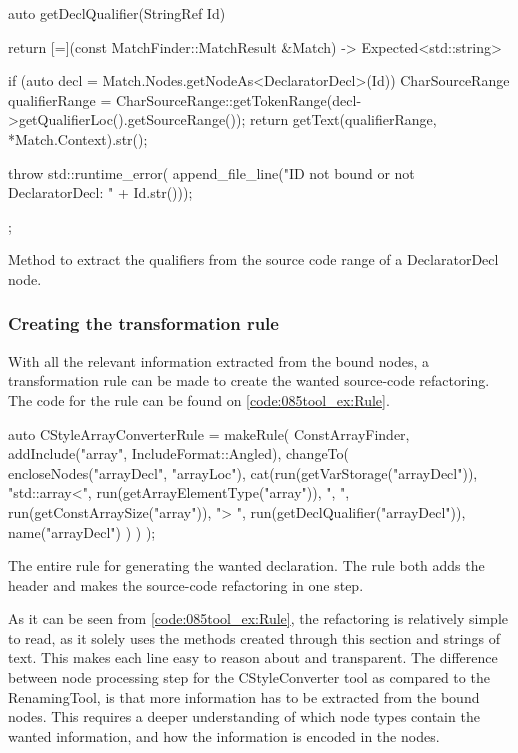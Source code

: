 \begin{listing}[H]
    \begin{cppcode}
auto getDeclQualifier(StringRef Id) {
    return [=](const MatchFinder::MatchResult &Match) -> Expected<std::string> {
        if (auto decl = Match.Nodes.getNodeAs<DeclaratorDecl>(Id)) {
            CharSourceRange qualifierRange = CharSourceRange::getTokenRange(decl->getQualifierLoc().getSourceRange());
            return getText(qualifierRange, *Match.Context).str();
        }

        throw std::runtime_error(
			    append_file_line("ID not bound or not DeclaratorDecl: " + Id.str()));
    };
}
    \end{cppcode}
    \caption{Method to extract the qualifiers from the source code range of a DeclaratorDecl node.}
    \label{code:085tool_ex:DeclaratorQualif}
\end{listing}

\subsubsection*{Creating the transformation rule}

With all the relevant information extracted from the bound nodes, a transformation rule can be made to create the wanted source-code refactoring. The code for the rule can be found on \cref{code:085tool_ex:Rule}.

\begin{listing}[H]
    \begin{cppcode}
auto CStyleArrayConverterRule = makeRule(
    ConstArrayFinder,
    {
        addInclude("array",
        IncludeFormat::Angled),
        changeTo(
            encloseNodes("arrayDecl", "arrayLoc"),
            cat(run(getVarStorage("arrayDecl")),
                "std::array<",
                run(getArrayElementType("array")),
                ", ",
                run(getConstArraySize("array")),
                "> ",
                run(getDeclQualifier("arrayDecl")),
                name("arrayDecl")
            )
        )
    });
    \end{cppcode}
    \caption{The entire rule for generating the wanted  declaration. The rule both adds the  header and makes the source-code refactoring in one step.}
    \label{code:085tool_ex:Rule}
\end{listing}

As it can be seen from \cref{code:085tool_ex:Rule}, the refactoring is relatively simple to read, as it solely uses the methods created through this section and strings of text. This makes each line easy to reason about and transparent. The difference between node processing step for the CStyleConverter tool as compared to the RenamingTool, is that more information has to be extracted from the bound nodes. This requires a deeper understanding of which node types contain the wanted information, and how the information is encoded in the nodes.

